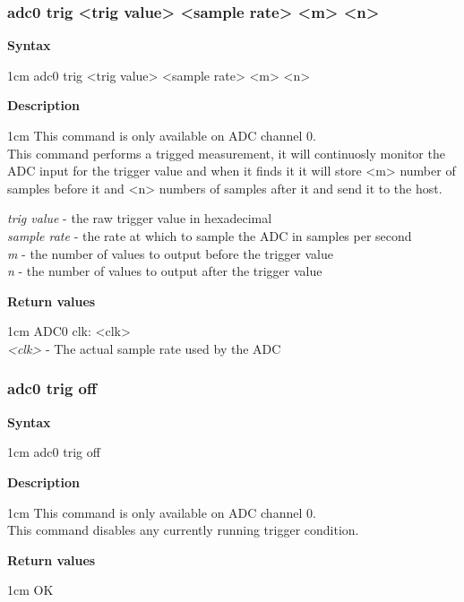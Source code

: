 \documentclass{article}[a4paper]
\begin{document}
\subsubsection{adc0 trig <trig value> <sample rate> <m> <n>}
\begin{tcolorbox}
	{\bf Syntax}

	 1cm \dimexpr\linewidth-2cm\relax
	adc0 trig <trig value> <sample rate> <m> <n>

	\medskip
	{\bf Description}

	 1cm \dimexpr\linewidth-2cm\relax
	This command is only available on ADC channel 0. \\
	This command performs a trigged measurement, it will continuosly monitor the
	ADC input for the trigger value and when it finds it it will store <m> number
	of samples before it and <n> numbers of samples after it and send it to the
	host.

	\medskip
	{\it trig value} - the raw trigger value in hexadecimal \\
	{\it sample rate} - the rate at which to sample the ADC in samples per second \\
	{\it m} - the number of values to output before the trigger value \\
	{\it n} - the number of values to output after the trigger value

	\medskip
	{\bf Return values}

	 1cm \dimexpr\linewidth-2cm\relax
	ADC0 clk: <clk> \\
	\medskip
	{\it <clk>} - The actual sample rate used by the ADC
\end{tcolorbox}

\subsubsection{adc0 trig off}
\begin{tcolorbox}
	{\bf Syntax}

	 1cm \dimexpr\linewidth-2cm\relax
	adc0 trig off

	\medskip
	{\bf Description}

	 1cm \dimexpr\linewidth-2cm\relax
	This command is only available on ADC channel 0. \\
	This command disables any currently running trigger condition.

	\medskip
	{\bf Return values}

	 1cm \dimexpr\linewidth-2cm\relax
	OK \\
\end{tcolorbox}
\end{document}
